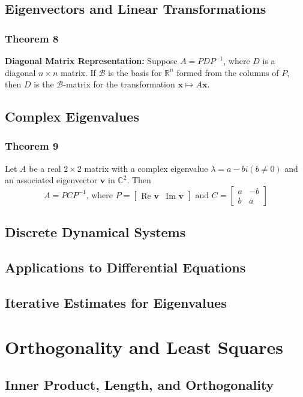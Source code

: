 \documentclass[letterpaper,11pt]{article}
\begin{document}
		\subsection{Eigenvectors and Linear Transformations}
			\subsubsection{Theorem 8}
				\textbf{Diagonal Matrix Representation:} Suppose $A=PDP^{-1}$, where $D$ is a diagonal $n\times n$ matrix. If $\mathcal{B}$ is the basis for $\mathbb{R}^n$ formed from the columns of $P$, then $D$ is the $\mathcal{B}$-matrix for the transformation $\mathbf{x}\mapsto A\mathbf{x}$.
		\subsection{Complex Eigenvalues}
			\subsubsection{Theorem 9}
				Let $A$ be a real $2\times 2$ matrix with a complex eigenvalue $\lambda=a-bi(b\neq 0)$ and an associated eigenvector $\mathbf{v}$ in $\mathbb{C}^2$. Then
				\begin{equation}
					A=PCP^{-1}\textrm{, where }P=\begin{bmatrix}
					\textrm{Re }\mathbf{v} & \textrm{Im }\mathbf{v}
					\end{bmatrix}\textrm{ and }C=\begin{bmatrix}
					a & -b \\ b & a
					\end{bmatrix}
				\end{equation}
		\subsection{Discrete Dynamical Systems}
		\subsection{Applications to Differential Equations}
		\subsection{Iterative Estimates for Eigenvalues}
	\section{Orthogonality and Least Squares}
		\subsection{Inner Product, Length, and Orthogonality}
\end{document}

